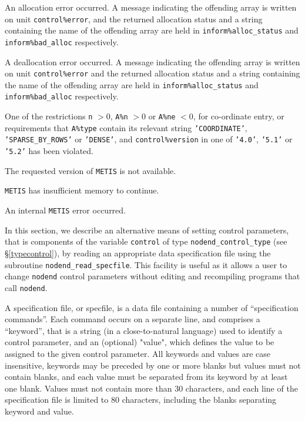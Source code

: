 \documentclass{galahad}
\newcommand{\packagename}{nodend}
\begin{document}
\begin{description}

\itt{\galerrallocate} An allocation error occurred. A message indicating
the offending
array is written on unit {\tt control\%error}, and the returned allocation
status and a string containing the name of the offending array
are held in {\tt inform\%alloc\_\-status}
and {\tt inform\%bad\_alloc} respectively.

\itt{\galerrdeallocate} A deallocation error occurred.
A message indicating the offending
array is written on unit {\tt control\%error} and the returned allocation
status and a string containing the name of the offending array
are held in {\tt inform\%alloc\_\-status}
and {\tt inform\%bad\_alloc} respectively.

\itt{\galerrrestrictions} One of the restrictions
 {\tt n} $> 0$,
 {\tt A\%n} $> 0$ or
 {\tt A\%ne} $< 0$, for co-ordinate entry,
  or requirements that {\tt A\%type}
  contain its relevant string
 {\tt 'COORDINATE'}, {\tt 'SPARSE\_BY\_ROWS'} or {\tt 'DENSE'}, and
 {\tt control\%version} in one of {\tt '4.0'}, {\tt '5.1'} or {\tt '5.2'}
  has been violated.

\itt{\galunknownsolver} The requested version of {\tt METIS} is not available.

\itt{\galerrmetismemory} {\tt METIS} has insufficient memory to continue.

\itt{\galerrmetis} An internal {\tt METIS} error occurred.

\end{description}


\galcontrolfeatures
\noindent In this section, we describe an alternative means of setting
control parameters, that is components of the variable {\tt control} of type
{\tt \packagename\_control\_type}
(see \S\ref{typecontrol}),
by reading an appropriate data specification file using the
subroutine {\tt \packagename\_read\_specfile}. This facility
is useful as it allows a user to change  {\tt \packagename} control parameters
without editing and recompiling programs that call {\tt \packagename}.

A specification file, or specfile, is a data file containing a number of
``specification commands''. Each command occurs on a separate line,
and comprises a ``keyword'',
that is a string (in a close-to-natural language) used to identify a
control parameter, and
an (optional) "value", which defines the value to be assigned to the given
control parameter. All keywords and values are case insensitive,
keywords may be preceded by one or more blanks but
values must not contain blanks, and
each value must be separated from its keyword by at least one blank.
Values must not contain more than 30 characters, and
each line of the specification file is limited to 80 characters,
including the blanks separating keyword and value.
\end{document}
